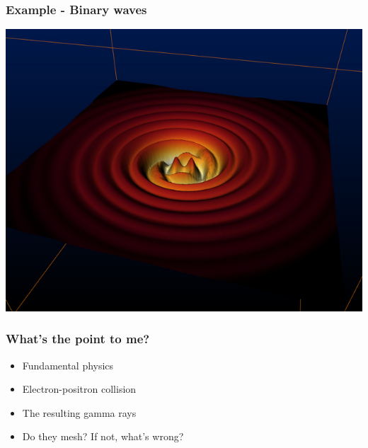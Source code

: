 \documentclass{beamer}
\begin{document}
\begin{frame}
  \frametitle{Example - Binary waves}
  \includegraphics[scale=0.5]{image2.jpg}
\end{frame}

\begin{frame}
  \frametitle{What's the point to me?}
  \begin{itemize}
    \item Fundamental physics
    \item Electron-positron collision
    \item The resulting gamma rays
    \item Do they mesh? If not, what's wrong?
  \end{itemize}
\end{frame}
\end{document}
